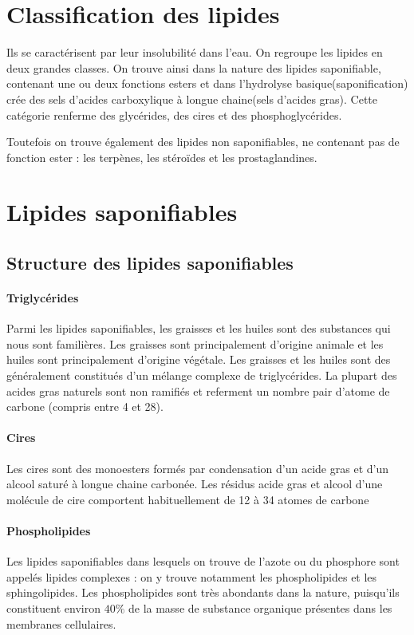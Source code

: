 \section{Classification des lipides}
Ils se caractérisent par leur insolubilité dans l'eau.
On regroupe les lipides en deux grandes classes.
On trouve ainsi dans la nature des lipides saponifiable, contenant une ou deux fonctions esters et dans l'hydrolyse basique(saponification) crée des sels d'acides carboxylique à longue chaine(sels d'acides gras).
Cette catégorie renferme des glycérides, des cires et des phosphoglycérides.

Toutefois on trouve également des lipides non saponifiables, ne contenant pas de fonction ester : les terpènes, les stéroïdes et les prostaglandines.

\section{Lipides saponifiables}

\subsection{Structure des lipides saponifiables}

\paragraph{Triglycérides}

Parmi les lipides saponifiables, les graisses et les huiles sont des substances qui nous sont familières.
Les graisses sont principalement d'origine animale et les huiles sont principalement d'origine végétale.
Les graisses et les huiles sont des généralement constitués d'un mélange complexe de triglycérides.
La plupart des acides gras naturels sont non ramifiés et referment un nombre pair d'atome de carbone (compris entre 4 et 28).


\paragraph{Cires}

Les cires sont des monoesters formés par condensation d'un acide gras et d'un alcool saturé à longue chaine carbonée.
Les résidus acide gras et alcool d'une molécule de cire comportent habituellement de 12 à 34 atomes de carbone

\paragraph{Phospholipides}
Les lipides saponifiables dans lesquels on trouve de l'azote ou du phosphore sont appelés lipides complexes : on y trouve notamment les phospholipides et les sphingolipides.
Les phospholipides sont très abondants dans la nature, puisqu'ils constituent environ $40 \%$ de la masse de substance organique présentes dans les membranes cellulaires.

